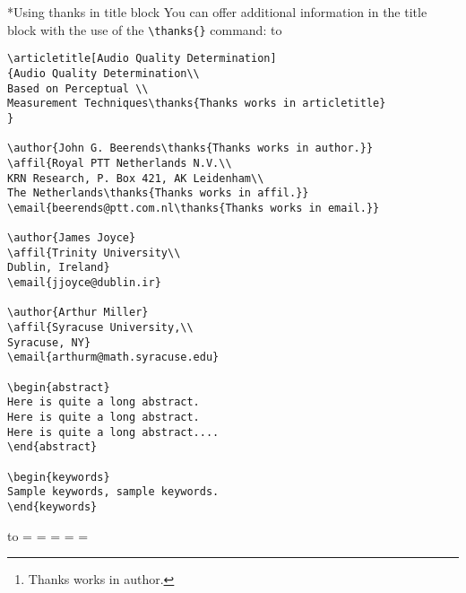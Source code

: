 \documentclass{kapproc} %
\makeatletter
\newif\ifdotoc
\def\contentsline#1#2#3{}\@starttoc{toc}}\fi
\def\numberline#1{}
\let\savechapter\chapter
\let\savesection\section
\let\savesubsection\subsection
\newif\ifdoctitle
\def\sqbullet{\raise.2ex\hbox{\vrule width 4pt height4pt}}
\let\savelabelitemi\labelitemi
\def\labelitemi{%
{\hbox to6pt{\sqbullet\hfill}}}
\def\ysection#1{\ifdotoc
\addcontentsline{toc}{section}{\protect\numberline{x}#1}\fi
{\let\uppercase\relax
\@startsection {section}{3}{-24pt}{-36pt plus -1pt minus 
 -1pt}{1sp}{\Large\bf}*{#1}}}
\def\section{\ysection}
\def\ysubsection#1#2{{\let\uppercase\relax%
\@startsection {subsection}{2}{-12pt}{-24pt plus -1pt minus 
 -1pt}{1sp}{\large\sc}#1{#2}}}
\def\subsection{\ysubsection*}
\let\savesubsubsection\subsubsection
\def\subsubsection{\savesubsubsection*}
\def\chapter#1{\global\doctitletrue
\vbox to  9.5pc{
\hyphenpenalty=10000 %
\parindent=-36pt
\vskip12pt\vskip-\parskip
\def\\ {\vskip-\parskip}
\booktitlefont\baselineskip=30pt
#1
\vskip1sp %
\moveright-36pt\vbox{\advance\hsize by 36pt
\hrule height 1.5pt  width \hsize
}\vfill}}
\let\save@listI\@listI
\let\save@listi\@listi
\def\code{\vskip3pt
\hbox to\textwidth{\vrule width \textwidth height .6pt}
\normalsize\vskip1sp}
\def\endcode{\vskip6pt}
\def\results{\bgroup
\let\pagestyle\eatone
\let\thispagestyle\eatone
\let\newpage\relax
\hbox to\hsize{.\dotfill.}
\vskip15pt
\bgroup
\def\contentsline##1##2##3{}
\def\addcontentsline##1##2##3{}
\def\addtocontents##1##2{}
\let\@listI\save@listI
\let\@listi\save@listi \@listi
\linewidth=\savehsize
\hsize=\savehsize
\textwidth=\savetextwidth
\parindent=\saveparindent
\parskip=\saveparskip
\let\chapter\savechapter
\let\section\savesection
\let\subsection\savesubsection
\let\subsubsection\savesubsubsection
\let\labelitemi\savelabelitemi
\normalsize\par}
\def\@listI{\leftmargin\leftmargini \parsep 4\p@ plus2\p@ minus\p@
\topsep 4\p@ plus2\p@ minus4\p@
\itemsep -3pt %
}
\let\@listi\@listI
\makeatother
\begin{document}
\subsection{Using thanks in title block}
You can offer additional information in the title block
with the use of the \verb+\thanks{}+ command:
\code
\begin{verbatim}
\articletitle[Audio Quality Determination]
{Audio Quality Determination\\
Based on Perceptual \\
Measurement Techniques\thanks{Thanks works in articletitle}
}

\author{John G. Beerends\thanks{Thanks works in author.}}
\affil{Royal PTT Netherlands N.V.\\
KRN Research, P. Box 421, AK Leidenham\\
The Netherlands\thanks{Thanks works in affil.}}
\email{beerends@ptt.com.nl\thanks{Thanks works in email.}}

\author{James Joyce}
\affil{Trinity University\\
Dublin, Ireland}
\email{jjoyce@dublin.ir}

\author{Arthur Miller}
\affil{Syracuse University,\\
Syracuse, NY}
\email{arthurm@math.syracuse.edu}

\begin{abstract}
Here is quite a long abstract.
Here is quite a long abstract.
Here is quite a long abstract....
\end{abstract}

\begin{keywords}
Sample keywords, sample keywords.
\end{keywords}
\end{verbatim}
\endcode
\newpage
\results
{}

\author{John G. Beerends\thanks{Thanks works in author.}}

\author{James Joyce}
\end{document}
